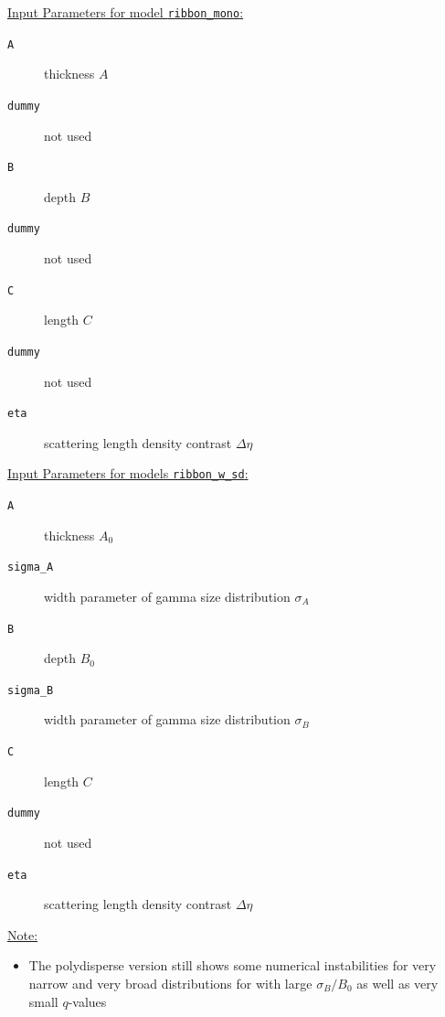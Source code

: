 \noindent \uline{Input Parameters for model \texttt{ribbon\_mono}:}\\
\begin{description}
\item[\texttt{A}] thickness $A$
\item[\texttt{dummy}] not used
\item[\texttt{B}] depth $B$
\item[\texttt{dummy}] not used
\item[\texttt{C}] length $C$
\item[\texttt{dummy}] not used
\item[\texttt{eta}] scattering length density contrast $\Delta\eta$
\end{description}

\noindent \uline{Input Parameters for models \texttt{ribbon\_w\_sd}:}\\
\begin{description}
\item[\texttt{A}] thickness $A_0$
\item[\texttt{sigma\_A}] width parameter of gamma size distribution $\sigma_A$
\item[\texttt{B}] depth $B_0$
\item[\texttt{sigma\_B}] width parameter of gamma size distribution $\sigma_B$
\item[\texttt{C}] length $C$
\item[\texttt{dummy}] not used
\item[\texttt{eta}] scattering length density contrast $\Delta\eta$
\end{description}

\noindent\uline{Note:}
\begin{itemize}
\item The polydisperse version still shows some numerical instabilities for very narrow and very broad distributions for with large $\sigma_B/B_0$ as well as very small $q$-values
\end{itemize}

\clearpage
